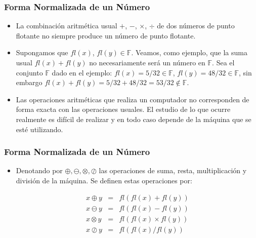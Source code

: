 \documentclass{beamer}
\begin{document}
\begin{frame}
  \frametitle{Forma Normalizada de un N\'umero}
  \begin{itemize}
   \item<1-> La combinaci\'on aritm\'etica usual $+$, $-$, $\times$, $\div$ de dos n\'umeros de punto flotante no siempre produce un n\'umero de punto flotante. 
   \item <2-> Supongamos que $fl(x)$, $fl(y) \in \mathbb{F}$. Veamos, como ejemplo, que la suma usual
   $fl(x)+fl(y)$ no necesariamente ser\'a un n\'umero en $\mathbb{F}$. Sea el conjunto $\mathbb{F}$ dado en el ejemplo: $fl(x) =5/32 \in \mathbb{F}$, $fl(y) =48/32 \in \mathbb{F}$, sin embargo $fl(x)+fl(y) =
   5/32 + 48/32 = 53/32 \notin \mathbb{F}$.
   \item Las operaciones aritm\'eticas que realiza un computador no corresponden de forma exacta con las operaciones usuales. El estudio de lo que ocurre realmente es dif\'icil de realizar y en todo caso depende de la m\'aquina que se est\'e
   utilizando.
  \end{itemize}
\end{frame}
\begin{frame}
   \frametitle{Forma Normalizada de un N\'umero}
   \begin{itemize}   
   \item Denotando por $\oplus,\ominus,\otimes,\oslash$ las operaciones de suma, resta, multiplicaci\'on y divisi\'on de la m\'aquina. Se definen estas operaciones por:
   \begin{block}{} 
   $$
   \begin{array}{lll}
    x \oplus y & = & fl(fl(x) + fl(y))\\
    x \ominus y & = & fl(fl(x) - fl(y))\\
    x \otimes y & = & fl(fl(x) \times fl(y))\\
    x \oslash y & = & fl(fl(x) / fl(y))\\
   \end{array}
   $$
   \end{block}
   \end{itemize}
\end{frame}
\end{document}
